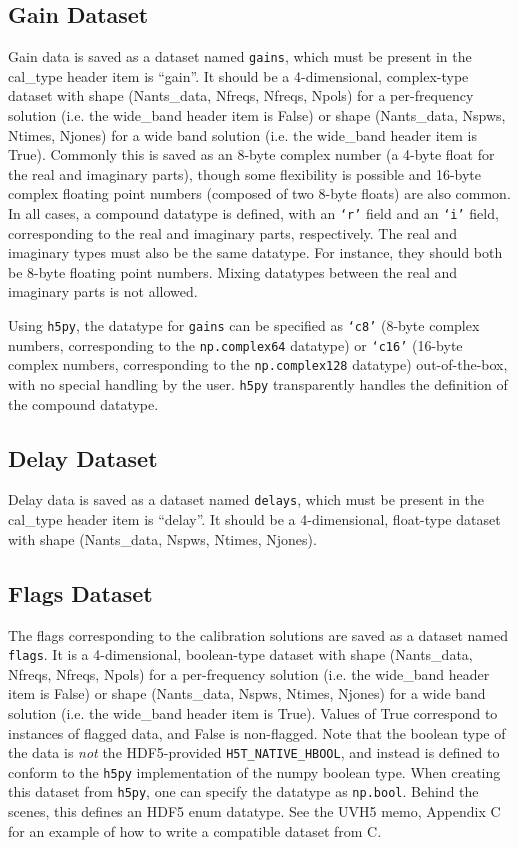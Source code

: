 \documentclass[11pt, oneside]{article}
\begin{document}
\subsection{Gain Dataset}
\label{sec:gaindata}
Gain data is saved as a dataset named \texttt{gains}, which must be present in the
cal\_type header item is ``gain''. It should be a 4-dimensional, complex-type dataset
with shape (Nants\_data, Nfreqs, Nfreqs, Npols) for a per-frequency solution
(i.e. the wide\_band header item is False) or shape (Nants\_data, Nspws, Ntimes, Njones)
for a wide band solution (i.e. the wide\_band header item is True).
Commonly this is saved as an 8-byte complex number (a 4-byte float for the real
and imaginary parts), though some flexibility is possible and 16-byte complex
floating point numbers (composed of two 8-byte floats) are also common. In all cases, a
compound datatype is defined, with an \texttt{`r'} field and an \texttt{`i'} field,
corresponding to the real and imaginary parts, respectively. The real and
imaginary types must also be the same datatype. For instance, they should both
be 8-byte floating point numbers. Mixing datatypes between the real and imaginary
parts is not allowed.

Using \texttt{h5py}, the datatype for \texttt{gains} can be specified as
\texttt{`c8'} (8-byte complex numbers, corresponding to the \texttt{np.complex64}
datatype) or \texttt{`c16'} (16-byte complex numbers, corresponding to the
\texttt{np.complex128} datatype) out-of-the-box, with no special handling by the
user. \texttt{h5py} transparently handles the definition of the compound
datatype.

\subsection{Delay Dataset}
\label{sec:delaydata}
Delay data is saved as a dataset named \texttt{delays}, which must be present in the
cal\_type header item is ``delay''. It should be a 4-dimensional, float-type dataset
with shape (Nants\_data, Nspws, Ntimes, Njones).

\subsection{Flags Dataset}
\label{sec:flags}
The flags corresponding to the calibration solutions are saved as a dataset named \texttt{flags}.
It is a 4-dimensional, boolean-type dataset with shape (Nants\_data, Nfreqs, Nfreqs, Npols)
for a per-frequency solution (i.e. the wide\_band header item is False) or shape
(Nants\_data, Nspws, Ntimes, Njones) for a wide band solution (i.e. the
wide\_band header item is True). Values of True correspond to instances of flagged data, and
False is non-flagged. Note that the boolean type of the data is \textit{not} the
HDF5-provided \texttt{H5T\_NATIVE\_HBOOL}, and instead is defined to conform to the
\texttt{h5py} implementation of the numpy boolean type. When creating this dataset
from \texttt{h5py}, one can specify the datatype as \texttt{np.bool}. Behind the
scenes, this defines an HDF5 enum datatype. See the UVH5 memo, Appendix C
for an example of how to write a compatible dataset from C.
\end{document}
